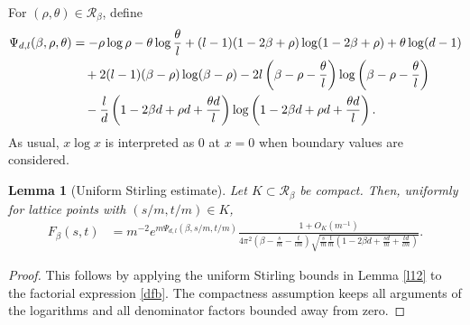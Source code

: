 \documentclass[11pt]{amsart}
\theoremstyle{plain}
\newtheorem{lemma}[theorem]{Lemma}
\numberwithin{equation}{section}
\numberwithin{theorem}{section}
\numberwithin{figure}{section}
\begin{document}
For $(\rho,\theta)\in\mathcal R_\beta$, define
\begin{align}
\Psi_{d,l}(\beta,\rho,\theta)
&=-\rho\log\rho-\theta\log\frac{\theta}{l}
+(l-1)(1-2\beta+\rho)\log(1-2\beta+\rho)+\theta\log(d-1)\notag\\
&\quad +2(l-1)(\beta-\rho)\log(\beta-\rho)
-2l\left(\beta-\rho-\frac{\theta}{l}\right)
\log\left(\beta-\rho-\frac{\theta}{l}\right)\notag\\
&\quad -\frac{l}{d}\left(1-2\beta d+\rho d+\frac{\theta d}{l}\right)
\log\left(1-2\beta d+\rho d+\frac{\theta d}{l}\right).
\label{pdp}
\end{align}
As usual, $x\log x$ is interpreted as $0$ at $x=0$ when boundary values are considered.

\begin{lemma}[Uniform Stirling estimate]\label{lem:second-stirling}
Let $K\subset\mathcal R_\beta$ be compact.  Then, uniformly for lattice points
with $(s/m,t/m)\in K$,
\begin{align}
F_\beta(s,t)
&=m^{-2}e^{m\Psi_{d,l}(\beta,s/m,t/m)}
\frac{1+O_K(m^{-1})}
{4\pi^2\left(\beta-\frac{s}{m}-\frac{t}{lm}\right)
\sqrt{\frac{s}{m}\frac{t}{m}
\left(1-2\beta d+\frac{sd}{m}+\frac{td}{lm}\right)}}.
\label{eq:second-stirling}
\end{align}
\end{lemma}

\begin{proof}
This follows by applying the uniform Stirling bounds in Lemma \ref{l12} to the factorial
expression \eqref{dfb}.  The compactness assumption keeps all arguments of the logarithms
and all denominator factors bounded away from zero.
\end{proof}
\end{document}
